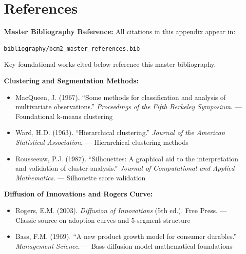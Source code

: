 \section{References}
\label{sec:ba-references}

\begin{tcolorbox}[colback=blue!5!white, colframe=blue!75!black]

\textbf{Master Bibliography Reference:}
All citations in this appendix appear in:
\begin{center}
\texttt{bibliography/bcm2\_master\_references.bib}
\end{center}

Key foundational works cited below reference this master bibliography.

\end{tcolorbox}

\vspace{1em}

\nocite{bcm2_master}

\textbf{Clustering and Segmentation Methods:}
\begin{itemize}
\item MacQueen, J. (1967). ``Some methods for classification and analysis of
  multivariate observations.'' \textit{Proceedings of the Fifth Berkeley Symposium}.
  --- Foundational k-means clustering
\item Ward, H.D. (1963). ``Hierarchical clustering.'' \textit{Journal of the
  American Statistical Association}. --- Hierarchical clustering methods
\item Rousseeuw, P.J. (1987). ``Silhouettes: A graphical aid to the interpretation
  and validation of cluster analysis.'' \textit{Journal of Computational and
  Applied Mathematics}. --- Silhouette score validation
\end{itemize}

\textbf{Diffusion of Innovations and Rogers Curve:}
\begin{itemize}
\item Rogers, E.M. (2003). \textit{Diffusion of Innovations} (5th ed.). Free Press.
  --- Classic source on adoption curves and 5-segment structure
\item Bass, F.M. (1969). ``A new product growth model for consumer durables.''
  \textit{Management Science}. --- Bass diffusion model mathematical foundations
\end{itemize}

